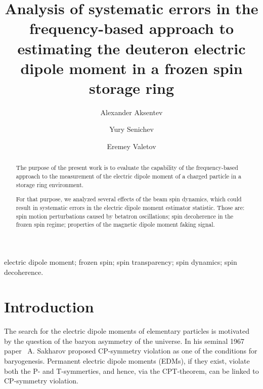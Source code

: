 \documentclass[preprint, review]{elsarticle}
\begin{document}
\begin{frontmatter}
\title{Analysis of systematic errors in the frequency-based approach to estimating
  the deuteron electric dipole moment in a frozen spin storage ring}

\author[FZJ,INR,MEPHI]{Alexander Aksentev}

\author[INR]{Yury Senichev}

\author[MSU]{Eremey Valetov}


\address[FZJ]{Institut f\"ur Kernphysik (IKP-2), Forschungszentrum J\"ulich,
  J\"ulich, Germany}
\address[INR]{Institute for Nuclear Research of the Russian Academy of Sciences,
  Moscow, Russia}
\address[MEPHI]{National Research Nuclear University ``MEPhI,''
  Moscow, Russia}
\address[MSU]{Department of Physics and Astronomy, Michigan State University,
  MI 48824, USA}


\begin{abstract}
  The purpose of the present work is to evaluate the capability of the frequency-based approach
  to the measurement of the electric dipole moment of a charged particle in a storage ring environment.

  For that purpose, we analyzed several effects of the beam spin dynamics, which could result in systematic
  errors in the electric dipole moment estimator statistic. Those are: spin motion perturbations caused by
  betatron oscillations; spin decoherence in the frozen spin regime; properties of the magnetic dipole
  moment faking signal.
\end{abstract}


\begin{keyword}
  electric dipole moment; frozen spin; spin transparency; spin dynamics; spin decoherence.
\end{keyword}

\end{frontmatter}


\tableofcontents

\linenumbers

\section{Introduction}
The search for the electric dipole moments of elementary particles is motivated by the question of
the baryon asymmetry of the universe. In his seminal 1967 paper~\cite{Sakharov:Baryogenesis} A. Sakharov
proposed CP-symmetry violation as one of the conditions for baryogenesis.
Permanent electric dipole moments (EDMs), if they exist, violate both the P- and T-symmerties, and hence,
via the CPT-theorem, can be linked to CP-symmetry violation.
\end{document}
